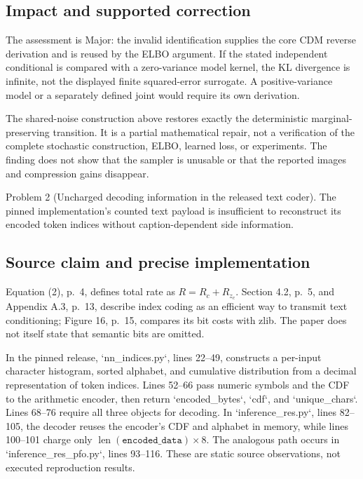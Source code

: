 \documentclass[10pt]{article}
\begin{document}
\subsection*{Impact and supported correction}
The assessment is Major: the invalid identification supplies the core CDM reverse derivation and is reused by the ELBO argument. If the stated independent conditional is compared with a zero-variance model kernel, the KL divergence is infinite, not the displayed finite squared-error surrogate. A positive-variance model or a separately defined joint would require its own derivation.\par
The shared-noise construction above restores exactly the deterministic marginal-preserving transition. It is a partial mathematical repair, not a verification of the complete stochastic construction, ELBO, learned loss, or experiments. The finding does not show that the sampler is unusable or that the reported images and compression gains disappear.\par
Problem 2 (Uncharged decoding information in the released text coder).  The pinned implementation’s counted text payload is insufficient to reconstruct its encoded token indices without caption-dependent side information.\par
\subsection*{Source claim and precise implementation}
Equation (2), p. 4, defines total rate as \(R=R_c+R_{z_c}\). Section 4.2, p. 5, and Appendix A.3, p. 13, describe index coding as an efficient way to transmit text conditioning; Figure 16, p. 15, compares its bit costs with zlib. The paper does not itself state that semantic bits are omitted.\par
In the pinned release, `nn\_indices.py`, lines 22–49, constructs a per-input character histogram, sorted alphabet, and cumulative distribution from a decimal representation of token indices. Lines 52–66 pass numeric symbols and the CDF to the arithmetic encoder, then return `encoded\_bytes`, `cdf`, and `unique\_chars`. Lines 68–76 require all three objects for decoding. In `inference\_res.py`, lines 82–105, the decoder reuses the encoder’s CDF and alphabet in memory, while lines 100–101 charge only \(\operatorname{len}(\texttt{encoded\_data})\times8\). The analogous path occurs in `inference\_res\_pfo.py`, lines 93–116. These are static source observations, not executed reproduction results.\par
\end{document}
